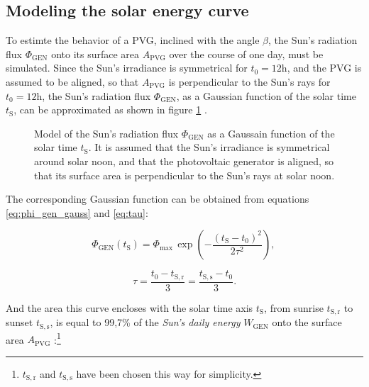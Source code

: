 %
%
%


\subsection{Modeling the solar energy curve} \label{sec:solar_energy_curve}
To estimte the behavior of a PVG, inclined with the angle $\beta$, the Sun's radiation flux $\Phi_{\mathrm{GEN}}$ onto its surface area $A_{\mathrm{PVG}}$ over the course of one day, must be simulated. Since the Sun's irradiance is symmetrical for $t_0 = 12\mathrm{h}$, and the PVG is assumed to be aligned, so that $A_{\mathrm{PVG}}$ is perpendicular to the Sun's rays for $t_0 = 12\mathrm{h}$, the Sun's radiation flux $\Phi_{\mathrm{GEN}}$, as a Gaussian function of the solar time $t_{\mathrm{S}}$, can be approximated as shown in figure \ref{fig:tikz_energy_gauss} \cite{Appelbaum:1993}.

\begin{figure}[h!]
	\centering
	
	\caption{Model of the Sun's radiation flux $\Phi_{\mathrm{GEN}}$ as a Gaussain function of the solar time $t_{\mathrm{S}}$. It is assumed that the Sun's irradiance is symmetrical around solar noon, and that the photovoltaic generator is aligned, so that its surface area is perpendicular to the Sun's rays at solar noon.}
	\label{fig:tikz_energy_gauss}
\end{figure}

The corresponding Gaussian function can be obtained from equations \ref{eq:phi_gen_gauss} and \ref{eq:tau}:

\begin{center}
	\begin{equation} \label{eq:phi_gen_gauss}
		\Phi_{\mathrm{GEN}}\left(t_{\mathrm{S}}\right) = \Phi_{\mathrm{max}} \, \exp\left(-\frac{(t_{\mathrm{S}} - t_0)^2}{2 \tau^2}\right) \text{, }
	\end{equation}
\end{center}

\begin{center}
	\begin{equation} \label{eq:tau}
		\tau = \frac{t_0 - t_{\mathrm{S,r}}}{3} = \frac{t_{\mathrm{S,s}} - t_0}{3} \text{.}
	\end{equation}
\end{center}

And the area this curve encloses with the solar time axis $t_{\mathrm{S}}$, from sunrise $t_{\mathrm{S,r}}$ to sunset $t_{\mathrm{S,s}}$, is equal to 99,7\% of the \emph{Sun's daily energy} $W_{\mathrm{GEN}}$ onto the surface area $A_{\mathrm{PVG}}$ \cite{Appelbaum:1993, Prechtl:2006, Prechtl:2008, Glover:2010, Schrufer:2014, AlNahhal:2019}:\footnote{$t_{\mathrm{S,r}}$ and $t_{\mathrm{S,s}}$ have been chosen this way for simplicity.}


